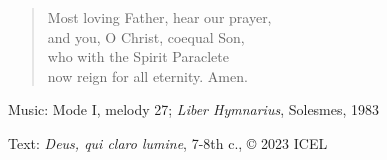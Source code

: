 \hymn



\setlength{\leftmargini}{2em}
\begin{verse}
Most loving Father, hear our prayer,\\
and you, O Christ, coequal Son,\\
who with the Spirit Paraclete\\
now reign for all eternity. Amen.
\end{verse}

\setlength{\leftmargini}{\defleftmargini}

\begin{hymnsource}
Music: Mode I, melody 27; \emph{Liber Hymnarius}, Solesmes, 1983

Text: \emph{Deus, qui claro lumine}, 7-8th c., © 2023 ICEL
\end{hymnsource}
